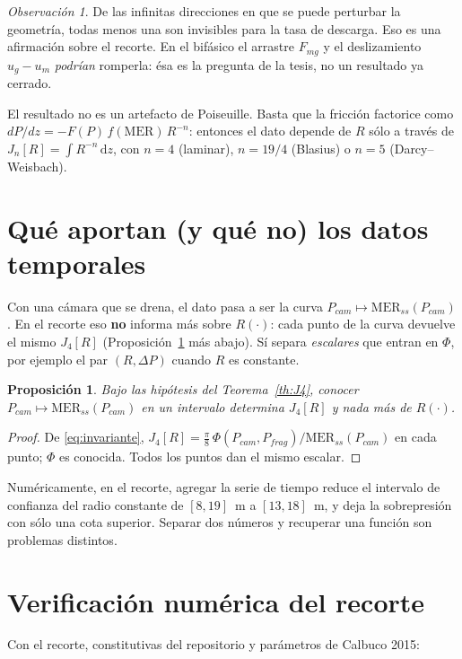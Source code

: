 \documentclass[11pt,a4paper]{article}
\theoremstyle{plain}
\newtheorem{proposicion}[teorema]{Proposición}
\theoremstyle{definition}
\theoremstyle{remark}
\newtheorem*{obs}{Observación}
\newcommand{\MER}{\mathrm{MER}}
\newcommand{\dd}{\,\mathrm{d}}
\begin{document}
\begin{obs}
De las infinitas direcciones en que se puede perturbar la geometría, todas
menos una son invisibles para la tasa de descarga. Eso es una afirmación
sobre el recorte. En el bifásico el arrastre $F_{mg}$ y el deslizamiento
$u_g-u_m$ \emph{podrían} romperla: ésa es la pregunta de la tesis, no un
resultado ya cerrado.
\end{obs}

El resultado no es un artefacto de Poiseuille. Basta que la fricción
factorice como $dP/dz=-F(P)\,f(\MER)\,R^{-n}$: entonces el dato depende de
$R$ sólo a través de $J_n[R]=\int R^{-n}\dd z$, con $n=4$ (laminar),
$n=19/4$ (Blasius) o $n=5$ (Darcy--Weisbach).

\section{Qué aportan (y qué no) los datos temporales}

Con una cámara que se drena, el dato pasa a ser la curva
$P_{cam}\mapsto\MER_{ss}(P_{cam})$. En el recorte eso \textbf{no} informa más
sobre $R(\cdot)$: cada punto de la curva devuelve el mismo $J_4[R]$
(Proposición~\ref{prop:tiempo} más abajo). Sí separa \emph{escalares} que
entran en $\Phi$, por ejemplo el par $(R,\Delta P)$ cuando $R$ es constante.

\begin{proposicion}\label{prop:tiempo}
Bajo las hipótesis del Teorema~\ref{th:J4}, conocer
$P_{cam}\mapsto\MER_{ss}(P_{cam})$ en un intervalo determina $J_4[R]$ y nada
más de $R(\cdot)$.
\end{proposicion}

\begin{proof}
De \eqref{eq:invariante},
$J_4[R]=\tfrac{\pi}{8}\,\Phi(P_{cam},P_{frag})/\MER_{ss}(P_{cam})$ en cada
punto; $\Phi$ es conocida. Todos los puntos dan el mismo escalar.
\end{proof}

Numéricamente, en el recorte, agregar la serie de tiempo reduce el intervalo
de confianza del radio constante de $[8,19]$~m a $[13,18]$~m, y deja la
sobrepresión con sólo una cota superior. Separar dos números y recuperar una
función son problemas distintos.

\section{Verificación numérica del recorte}

Con el recorte, constitutivas del repositorio y parámetros de Calbuco 2015:
\end{document}
